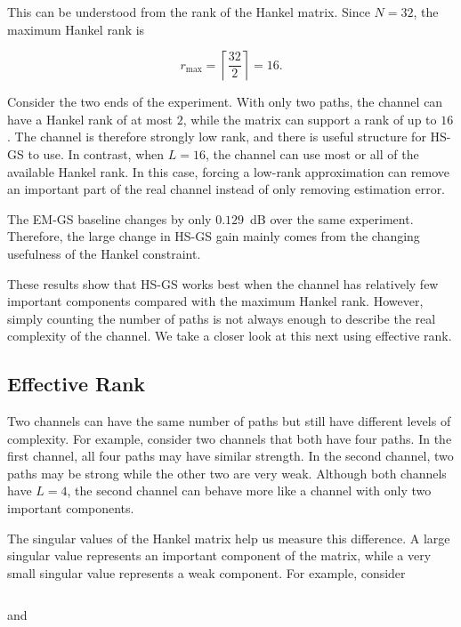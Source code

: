 \documentclass[journal]{IEEEtran}
\begin{document}
This can be understood from the rank of the Hankel matrix. Since $N=32$,
the maximum Hankel rank is

\begin{equation}
r_{\max}
=
\left\lceil
\frac{32}{2}
\right\rceil
=
16.
\end{equation}

Consider the two ends of the experiment. With only two paths, the channel
can have a Hankel rank of at most $2$, while the matrix can support a rank
of up to $16$. The channel is therefore strongly low rank, and there is
useful structure for HS-GS to use. In contrast, when $L=16$, the channel
can use most or all of the available Hankel rank. In this case, forcing a
low-rank approximation can remove an important part of the real channel
instead of only removing estimation error.

The EM-GS baseline changes by only $0.129$~dB over the same experiment.
Therefore, the large change in HS-GS gain mainly comes from the changing
usefulness of the Hankel constraint.

These results show that HS-GS works best when the channel
has relatively few important components compared with the maximum Hankel
rank. However, simply counting the number of paths is not always enough to
describe the real complexity of the channel. We take a closer look at this
next using effective rank.
\subsection{Effective Rank}
\label{sec:effrank}

Two channels can have the same number of paths but still have different
levels of complexity. For example, consider two channels that both have
four paths. In the first channel, all four paths may have similar strength.
In the second channel, two paths may be strong while the other two are very
weak. Although both channels have $L=4$, the second channel can behave
more like a channel with only two important components.

The singular values of the Hankel matrix help us measure this difference.
A large singular value represents an important component of the matrix,
while a very small singular value represents a weak component. For example,
consider

\begin{equation}
[10,\;9,\;8,\;7]
\end{equation}

and
\end{document}
